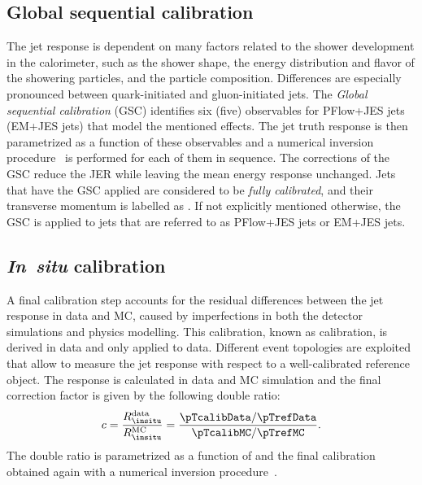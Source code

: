 \subsection{Global sequential calibration}
The jet response is dependent on many factors related to the shower development in the calorimeter, such as the shower shape, the energy distribution and flavor of the showering particles, and the particle composition.
Differences are especially pronounced between quark-initiated and gluon-initiated jets.
The \emph{Global sequential calibration} (GSC) identifies six (five) observables for PFlow+JES jets (EM+JES jets) that model the mentioned effects. The jet truth response is then parametrized as a function of these observables and a numerical inversion procedure~\cite{PERF-2011-03} is performed for each of them in sequence.
The corrections of the GSC reduce the JER while leaving the mean energy response unchanged.
Jets that have the GSC applied are considered to be \emph{fully calibrated}, and their transverse momentum is labelled as \pTcalib. If not explicitly mentioned otherwise, the GSC is applied to jets that are referred to as PFlow+JES jets or EM+JES jets.

\subsection{\textbf{\emph{In~situ}} calibration}
\label{subsec:insitu-calibration}
A final calibration step accounts for the residual differences between the jet response in data and MC, caused by imperfections in both the detector simulations and physics modelling. This calibration, known as \emph{\insitu} calibration, is derived in data and only applied to data.
Different event topologies are exploited that allow to measure the jet response with respect to a well-calibrated reference object. The \insitu response is calculated in data and MC simulation and the final correction factor is given by the following double ratio:
\begin{equation}
    c = \frac{R_{\insitu}^{\text{data}}}{R_{\insitu}^{\text{MC}}} = \frac{ \pTcalibData / \pTrefData}{\pTcalibMC / \pTrefMC}.
\end{equation}
The double ratio is parametrized as a function of \pTref and the final calibration obtained again with a numerical inversion procedure~\cite{PERF-2011-03}.

